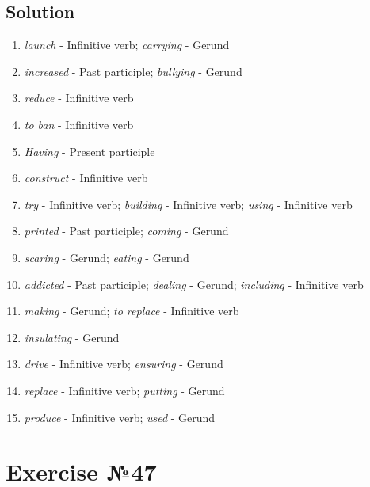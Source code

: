 \subsection*{Solution}
\begin{enumerate}
      \item \textit{launch} - Infinitive verb; \textit{carrying} - Gerund
      \item \textit{increased} - Past participle; \textit{bullying} - Gerund
      \item \textit{reduce} - Infinitive verb
      \item \textit{to ban} - Infinitive verb
      \item \textit{Having} - Present participle
      \item \textit{construct} - Infinitive verb
      \item \textit{try} - Infinitive verb; \textit{building} - Infinitive verb; \textit{using} - Infinitive verb
      \item \textit{printed} - Past participle; \textit{coming} - Gerund
      \item \textit{scaring} - Gerund; \textit{eating} - Gerund
      \item \textit{addicted} - Past participle; \textit{dealing} - Gerund; \textit{including} - Infinitive verb
      \item \textit{making} - Gerund; \textit{to replace} - Infinitive verb
      \item \textit{insulating} - Gerund
      \item \textit{drive} - Infinitive verb; \textit{ensuring} - Gerund
      \item \textit{replace} - Infinitive verb; \textit{putting} - Gerund
      \item \textit{produce} - Infinitive verb; \textit{used} - Gerund
\end{enumerate}

\section{Exercise №47}
